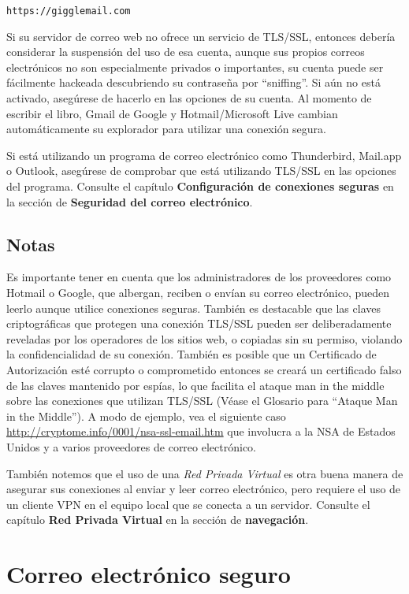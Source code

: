 \documentclass[10pt,a5paper,twoside,,]{book}
\begin{document}
\texttt{https://gigglemail.com}

Si su servidor de correo web no ofrece un servicio de TLS/SSL, entonces
debería considerar la suspensión del uso de esa cuenta, aunque sus
propios correos electrónicos no son especialmente privados o
importantes, su cuenta puede ser fácilmente hackeada descubriendo su
contraseña por ``sniffing''. Si aún no está activado, asegúrese de
hacerlo en las opciones de su cuenta. Al momento de escribir el libro,
Gmail de Google y Hotmail/Microsoft Live cambian automáticamente su
explorador para utilizar una conexión segura.

Si está utilizando un programa de correo electrónico como Thunderbird,
Mail.app o Outlook, asegúrese de comprobar que está utilizando TLS/SSL
en las opciones del programa. Consulte el capítulo \textbf{Configuración
de conexiones seguras} en la sección de \textbf{Seguridad del correo
electrónico}.

\section{Notas}\label{notas}

Es importante tener en cuenta que los administradores de los proveedores
como Hotmail o Google, que albergan, reciben o envían su correo
electrónico, pueden leerlo aunque utilice conexiones seguras. También es
destacable que las claves criptográficas que protegen una conexión
TLS/SSL pueden ser deliberadamente reveladas por los operadores de los
sitios web, o copiadas sin su permiso, violando la confidencialidad de
su conexión. También es posible que un Certificado de Autorización esté
corrupto o comprometido entonces se creará un certificado falso de las
claves mantenido por espías, lo que facilita el ataque man in the middle
sobre las conexiones que utilizan TLS/SSL (Véase el Glosario para
``Ataque Man in the Middle''). A modo de ejemplo, vea el siguiente caso
\url{http://cryptome.info/0001/nsa-ssl-email.htm} que involucra a la NSA
de Estados Unidos y a varios proveedores de correo electrónico.

También notemos que el uso de una \emph{Red Privada Virtual} es otra
buena manera de asegurar sus conexiones al enviar y leer correo
electrónico, pero requiere el uso de un cliente VPN en el equipo local
que se conecta a un servidor. Consulte el capítulo \textbf{Red Privada
Virtual} en la sección de \textbf{navegación}.

\chapter{Correo electrónico seguro}\label{correo-electruxf3nico-seguro}
\end{document}
